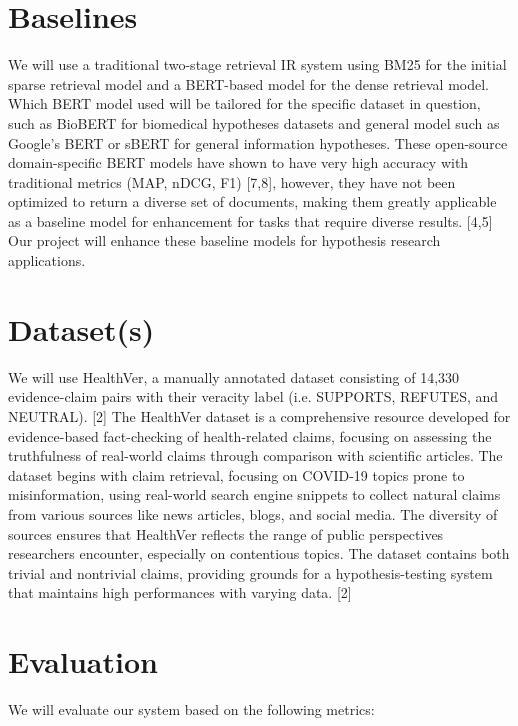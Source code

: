 \documentclass[sigconf]{acmart}
\begin{document}
\section{Baselines}
We will use a traditional two-stage retrieval IR system using BM25 for the initial sparse retrieval model and a BERT-based model for the dense retrieval model. Which BERT model used will be tailored for the specific dataset in question, such as BioBERT for biomedical hypotheses datasets and general model such as Google’s BERT or sBERT for general information hypotheses. These open-source domain-specific BERT models have shown to have very high accuracy with traditional metrics (MAP, nDCG, F1) [7,8], however, they have not been optimized to return a diverse set of documents, making them greatly applicable as a baseline model for enhancement for tasks that require diverse results. [4,5] Our project will enhance these baseline models for hypothesis research applications. 

\section{Dataset(s)}
We will use HealthVer, a manually annotated dataset consisting of 14,330 evidence-claim pairs with their veracity label (i.e. SUPPORTS, REFUTES, and NEUTRAL). [2] The HealthVer dataset is a comprehensive resource developed for evidence-based fact-checking of health-related claims, focusing on assessing the truthfulness of real-world claims through comparison with scientific articles. The dataset begins with claim retrieval, focusing on COVID-19 topics prone to misinformation, using real-world search engine snippets to collect natural claims from various sources like news articles, blogs, and social media. The diversity of sources ensures that HealthVer reflects the range of public perspectives researchers encounter, especially on contentious topics. The dataset contains both trivial and nontrivial claims, providing grounds for a hypothesis-testing system that maintains high performances with varying data. [2]

\section{Evaluation}

We will evaluate our system based on the following metrics:
\end{document}
